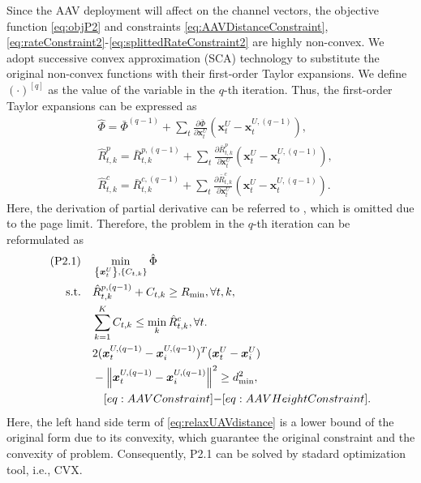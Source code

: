 \documentclass[twocolumn,journal]{IEEEtran}
\begin{document}
Since the AAV deployment will affect on the channel vectors, the objective function \eqref{eq:objP2} and constraints \eqref{eq:AAVDistanceConstraint}, \eqref{eq:rateConstraint2}-\eqref{eq:splittedRateConstraint2} are highly non-convex. We adopt successive convex approximation (SCA) technology to substitute the original non-convex functions with their first-order Taylor expansions. 
We define \((\cdot)^{[q]}\) as the value of the variable in the \(q\)-th iteration. Thus, the first-order Taylor expansions can be expressed as
\begin{subequations}
\begin{align}
    &\hat{\Phi} = \bar{{\Phi}}^{(q-1)} + \sum_{t}\frac{\partial \bar{{\Phi}}}{\partial \boldsymbol{x}^{U}_{t}}\left(\boldsymbol{x}^{U}_{t}-\boldsymbol{x}^{U,(q-1)}_{t}\right),\\
    &\hat{R}^{p}_{t,k} = \bar{R}^{p,(q-1)}_{t,k}+\sum_t \frac{\partial \bar{R}^{p}_{t,k}}{\partial \boldsymbol{x}^{U}_{t}}\left(\boldsymbol{x}^{U}_{t}-\boldsymbol{x}^{U,(q-1)}_{t}\right),\\
    &\hat{R}^{c}_{t,k} =\bar{R}^{c,(q-1)}_{t,k}+\sum_t \frac{\partial \bar{R}^{c}_{t,k}}{\partial \boldsymbol{x}^{U}_{t}}\left(\boldsymbol{x}^{U}_{t}-\boldsymbol{x}^{U,(q-1)}_{t}\right).
\end{align}
\end{subequations}
Here, the derivation of partial derivative can be referred to \cite{lyuJoint2023}, which is omitted due to the page limit. Therefore, the problem in the \(q\)-th iteration can be reformulated as
\begin{subequations}
\begin{align}
    (\text{P2.1})\quad&\min_{\left\{\boldsymbol{x}^{U}_{t}\right\},\left\{C_{t,k}\right\}} \hat{\Phi}\label{eq:objP2}\\
    \text{s.t.}\quad& \hat{R}^{p,(q-1)}_{t,k} + C_{t,k} \geq R_{\min}, \forall t,k, \label{eq:rateConstraint2.1}
    \\
    & \sum_{k=1}^{K} C_{t,k} \leq \min_{k}\hat{R}^{c}_{t,k}, \forall t. \label{eq:splittedRateConstraint2.1}\\
    & 2(\boldsymbol{x}^{U,(q-1)}_{t} - \boldsymbol{x}^{U,(q-1)}_{i})^T(\boldsymbol{x}^{U}_{t} - \boldsymbol{x}^{U}_{i})\notag\\
    & - \left\Vert \boldsymbol{x}^{U,(q-1)}_{t} - \boldsymbol{x}^{U,(q-1)}_{i}\right\Vert^2 \geq d_{\min}^2,\label{eq:relaxUAVdistance}
    \\
    &\quad\eqref{eq:AAVConstraint}\mbox{-}\eqref{eq:AAVHeightConstraint}.\notag
\end{align}
\end{subequations}
Here, the left hand side term of \eqref{eq:relaxUAVdistance} is a lower bound of the original form due to its convexity, which guarantee the original constraint and the convexity of problem. Consequently, P2.1 can be solved by stadard optimization tool, i.e., CVX.
\end{document}
